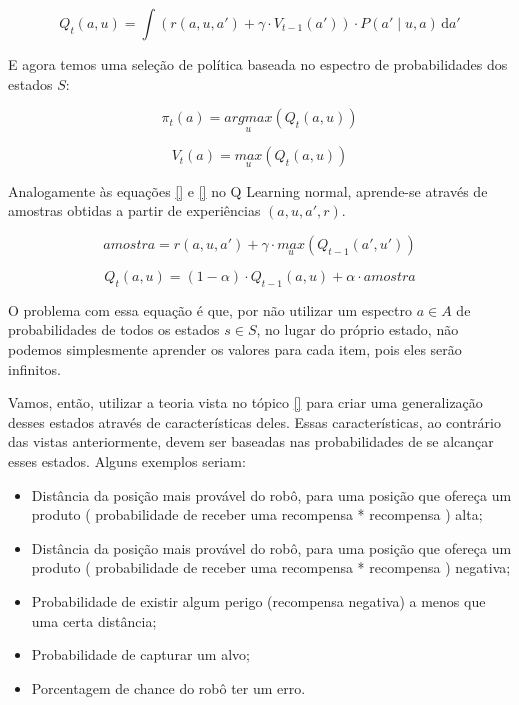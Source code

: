 \begin{equation} \label{equation:QValueFunctionPartiallyObservable}
    Q_t \left( a, u \right) = \int \! \left( r \left( a, u, a' \right) + \gamma \cdot V_{t-1} \left( a' \right) \right) \cdot P \left( a' \mid u, a \right) \, \mathrm{d}a'
\end{equation}

E agora temos uma seleção de política baseada no espectro de probabilidades dos estados $ S $:

\begin{equation} \label{equation:PolicySelectionPartiallyObservable}
    \pi_t \left( a \right) = \underset{u}{argmax} \left( Q_t \left( a, u \right) \right)
\end{equation}

\begin{equation}
    V_t \left( a \right) = \underset{u}{max} \left( Q_t \left( a, u \right) \right)
\end{equation}


Analogamente às equações \ref{} e \ref{} no Q Learning normal, aprende-se através de amostras obtidas a partir de experiências $ \left( a, u, a', r \right) $.


\begin{equation}
	amostra = r \left( a, u, a' \right) + \gamma \cdot \underset{u}{max} \left( Q_{t-1} \left( a', u' \right) \right)
\end{equation}

\begin{equation}
	Q_t \left( a, u \right) = \left( 1 - \alpha \right) \cdot Q_{t-1} \left( a, u \right) + \alpha \cdot amostra
\end{equation}

O problema com essa equação é que, por não utilizar um espectro $ a \in A $ de probabilidades de todos os estados $ s \in S $, no lugar do próprio estado, não podemos simplesmente aprender os valores para cada item, pois eles serão infinitos.

Vamos, então, utilizar a teoria vista no tópico \ref{} para criar uma generalização desses estados através de características deles. Essas características, ao contrário das vistas anteriormente, devem ser baseadas nas probabilidades de se alcançar esses estados. Alguns exemplos seriam:

\begin{itemize}
	\item Distância da posição mais provável do robô, para uma posição que ofereça um produto ( probabilidade de receber uma recompensa * recompensa ) alta;
	\item Distância da posição mais provável do robô, para uma posição que ofereça um produto ( probabilidade de receber uma recompensa * recompensa ) negativa;
	\item Probabilidade de existir algum perigo (recompensa negativa) a menos que uma certa distância;
	\item Probabilidade de capturar um alvo;
	\item Porcentagem de chance do robô ter um erro.
\end{itemize}

